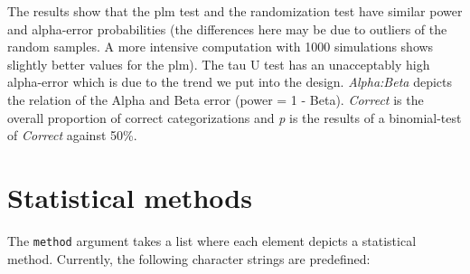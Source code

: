 \documentclass[
  letterpaper,
  DIV=11,
  numbers=noendperiod]{scrreprt}
\begin{document}
The results show that the plm test and the randomization test have
similar power and alpha-error probabilities (the differences here may be
due to outliers of the random samples. A more intensive computation with
1000 simulations shows slightly better values for the plm). The tau U
test has an unacceptably high alpha-error which is due to the trend we
put into the design. \emph{Alpha:Beta} depicts the relation of the Alpha
and Beta error (power = 1 - Beta). \emph{Correct} is the overall
proportion of correct categorizations and \emph{p} is the results of a
binomial-test of \emph{Correct} against 50\%.

\hypertarget{statistical-methods}{%
\section{Statistical methods}\label{statistical-methods}}

The \texttt{method} argument takes a list where each element depicts a
statistical method. Currently, the following character strings are
predefined:
\end{document}
